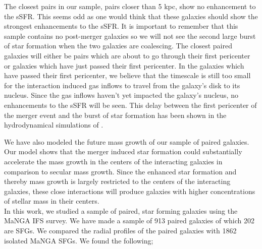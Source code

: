 \documentclass[iop,revtex4,twocolumn,apj,numberedappendix,appendixfloats]{emulateapj}
\begin{document}
The closest pairs in our sample, pairs closer than 5 kpc, show no enhancement to the sSFR. This seems odd as one would think that these galaxies should show the strongest enhancements to the sSFR. It is important to remember that this sample contains no post-merger galaxies so we will not see the second large burst of star formation when the two galaxies are coalescing. The closest paired galaxies will either be pairs which are about to go through their first pericenter or galaxies which have just passed their first pericenter. In the galaxies which have passed their first pericenter, we believe that the timescale is still too small for the interaction induced gas inflows to travel from the galaxy's disk to its nucleus. Since the gas inflows haven't yet impacted the galaxy's nucleus, no enhancements to the sSFR will be seen. This delay between the first pericenter of the merger event and the burst of star formation has been shown in the hydrodynamical simulations of \citet{Scudder:2012}.

We have also modeled the future mass growth of our sample of paired galaxies. Our model shows that the merger induced star formation could substantially accelerate the mass growth in the centers of the interacting galaxies in comparison to secular mass growth. Since the enhanced star formation and thereby mass growth is largely restricted to the centers of the interacting galaxies, these close interactions will produce galaxies with higher concentrations of stellar mass in their centers. \\ 


In this work, we studied a sample of paired, star forming galaxies using the MaNGA IFS survey. We have made a sample of 913 paired galaxies of which 202 are SFGs. We compared the radial profiles of the paired galaxies with 1862 isolated MaNGA SFGs. We found the following;
\end{document}
